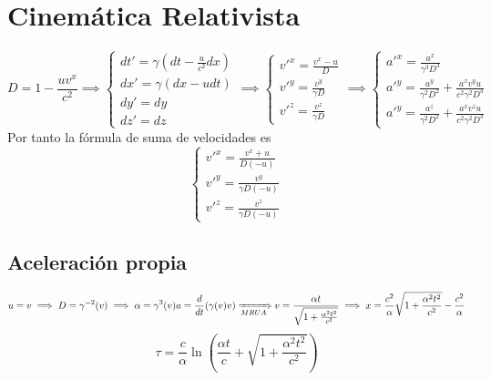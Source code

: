 \documentclass{myclass}
\newcommand{\1}{\tikz[baseline=(char.base)]{
            \node[shape=circle,draw,inner sep=1pt] (char) {1};}}
\newcommand{\2}{\tikz[baseline=(char.base)]{
            \node[shape=circle,draw,inner sep=1pt] (char) {2};}}
\newcommand{\g}{\gamma}
\begin{document}
\section{Cinemática Relativista}
 $$ D = 1-\dfrac{uv^x}{c^2} \implies 
\begin{cases}
dt'=\g (dt-\frac{u}{c^2}dx) \\
dx' = \g (dx-udt) \\
dy' = dy\\
dz' = dz
\end{cases}
\implies 
\begin{cases}
v'^x = \frac{v^x - u}{D} \\
v'^y =  \frac{v^y}{\g D}\\
v'^z =  \frac{v^z}{\g D}
\end{cases}
\implies 
\begin{cases}
a'^x = \frac{a^x}{\g^3D^3} \\
a'^y =  \frac{a^y}{\g^2 D^2} + \frac{a^xv^yu}{c^2\g^2D^3}\\
a'^y =  \frac{a^z}{\g^2 D^2} + \frac{a^xv^zu}{c^2\g^2D^3}
\end{cases}
$$
Por tanto la fórmula de suma de velocidades es
$$
\begin{cases}
v'^x = \frac{v^x + u}{D(-u)} \\
v'^y =  \frac{v^y}{\g D(-u)}\\
v'^z =  \frac{v^z}{\g D(-u)}
\end{cases}
$$

\subsection{Aceleración propia}
$$
u=v \implies D=\g^{-2}(v) \implies \alpha = \g^3(v)a=\dfrac{d}{dt}(\g (v)v) \xRightarrow[MRUA]{} v = \frac{\alpha t}{\sqrt{1+\frac{\alpha^2t^2}{c^2}}} \implies x = \frac{c^2}{\alpha}\sqrt{1+\frac{\alpha^2t^2}{c^2}} - \frac{c^2}{\alpha}
$$
$$
{\tau ={\frac {c}{\alpha}}\ln \left({\frac {\alpha t}{c}}+{\sqrt {1+{\frac {\alpha^{2}t^{2}}{c^{2}}}}}\right)}
$$
\end{document}
